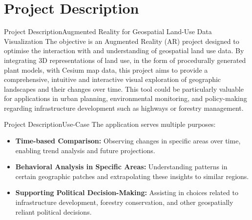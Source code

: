 \documentclass[t,aspectratio=169,divpsnames]{beamer}
\begin{document}
\section{Project Description}
\begin{frame}{Project Description}{Augmented Reality for Geospatial Land-Use Data Visualization}
The objective is an Augmented Reality (AR) project designed to optimise the interaction with and understanding of geospatial land use data. By integrating 3D representations of land use, in the form of procedurally generated plant models, with Cesium map data, this project aims to provide a comprehensive, intuitive and interactive visual exploration of geographic landscapes and their changes over time. This tool could be particularly valuable for applications in urban planning, environmental monitoring, and policy-making regarding infrastructure development such as highways or forestry management.
\end{frame}
\begin{frame}{Project Description}{Use-Case}
The application serves multiple purposes:
\begin{itemize}
    \item \textbf{Time-based Comparison:} Observing changes in specific areas over time, enabling trend analysis and future projections.
    \item \textbf{Behavioral Analysis in Specific Areas:} Understanding patterns in certain geographic patches and extrapolating these insights to similar regions.
    \item \textbf{Supporting Political Decision-Making:} Assisting in choices related to infrastructure development, forestry conservation, and other geospatially reliant political decisions.
\end{itemize}
\end{frame}
\end{document}
